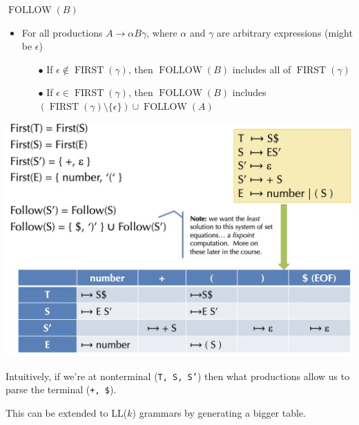 \begin{algorithm} $\operatorname{FOLLOW}(B)$
\begin{itemize}
    \item For all productions $A \to \alpha B \gamma$, where $\alpha$ and $\gamma$ are arbitrary expressions (might be $\epsilon$)
    \begin{itemize}
        \item[$\bullet$] If $\epsilon \not \in \operatorname{FIRST}(\gamma)$, then $\operatorname{FOLLOW}(B)$ includes all of $\operatorname{FIRST}(\gamma)$
        \item[$\bullet$] If $\epsilon \in \operatorname{FIRST}(\gamma)$, then $\operatorname{FOLLOW}(B)$ includes $(\operatorname{FIRST}(\gamma) \setminus \{ \epsilon \} ) \cup \operatorname{FOLLOW}(A)$
    \end{itemize}
\end{itemize}
    
\end{algorithm}

\begin{center}
	\includegraphics[width=\linewidth]{assets/ll1.png}
\end{center}
\vspace{-10pt}
Intuitively, if we're at nonterminal (\texttt{T, S, S'}) then what productions allow us to parse the terminal (\texttt{+, \$}).

This can be extended to LL($k$) grammars by generating a bigger table.

